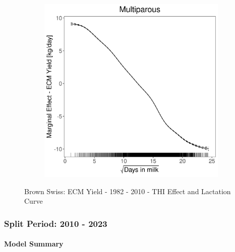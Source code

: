 \begin{figure}[H]
\begin{subfigure}[b]{0.45\textwidth}
    \end{subfigure}
    \hspace{0.05\textwidth} %
    \begin{subfigure}[b]{0.45\textwidth}
        \centering
        \includegraphics[width=\textwidth]{thesis/figures/models/ecm/before2010/bs_ecm_before2010/bs_ecm_before2010_marginal_dim_milk_multi.png}
    \end{subfigure}
    \caption[]{Brown Swiss: ECM Yield - 1982 - 2010 - THI Effect and Lactation Curve}
    \label{fig:main}
\end{figure}

\subsubsection{Split Period: 2010 - 2023}\label{model:bs_ecm_after}

\paragraph{Model Summary} \quad \\

